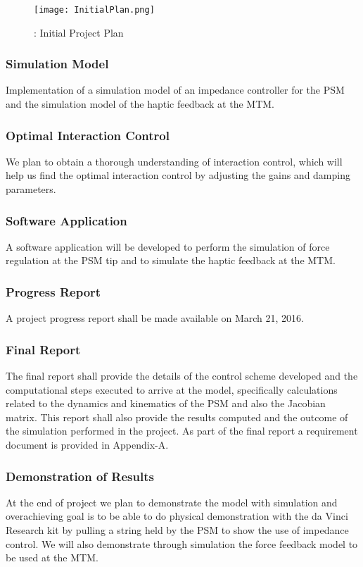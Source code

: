 \documentclass[10pt,journal,compsoc]{IEEEtran}
\newcommand\textss[1]{\stackengine{.9ex}{}{\scriptsize#1}{O}{l}{F}{F}{L}}
\begin{document}
\begin{figure}[h]
\begin{center}
\texttt{[image: InitialPlan.png]}
\caption{: Initial Project Plan}
\label{fig:InitialPlan}
\end{center}
\end{figure}

\subsubsection{Simulation Model}
Implementation of a simulation model of an impedance controller for the PSM and the simulation model of the haptic feedback at the MTM. 

\subsubsection{Optimal Interaction Control}
We plan to obtain a thorough understanding of interaction control, which will help us find the optimal interaction control by adjusting the gains and damping parameters.

\subsubsection{Software Application}
A software application will be developed to perform the simulation of force regulation at the PSM tip and to simulate the haptic feedback at the MTM.

\subsubsection{Progress Report}
 A project progress report shall be made available on March 21\textss{st}, 2016. 
 
\subsubsection{Final Report}
The final report shall provide the details of the control scheme developed and the computational steps executed to arrive at the model, specifically calculations related to the dynamics and kinematics of the PSM and also the Jacobian matrix. This report shall also provide the results computed and the outcome of the simulation performed in the project. 
As part of the final report a requirement document is provided in Appendix-A.

\subsubsection{Demonstration of Results}
At the end of project we plan to demonstrate the model with simulation and overachieving goal is to be able to do physical demonstration with the da Vinci Research kit by pulling a string held by the PSM to show the use of impedance control. We will also demonstrate through simulation the force feedback model to be used at the MTM.
\end{document}
